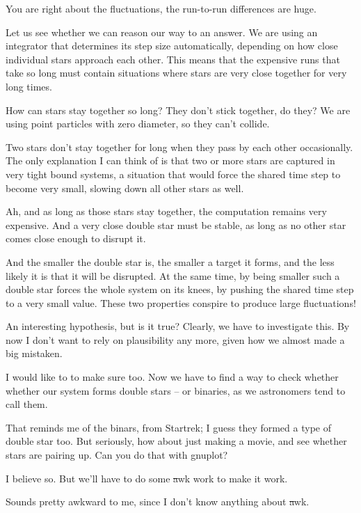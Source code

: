 \abc

\carol
You are right about the fluctuations, the run-to-run differences are huge.

\alice
Let us see whether we can reason our way to an answer.  We are using
an integrator that determines its step size automatically, depending on
how close individual stars approach each other.  This means that the
expensive runs that take so long must contain situations where stars
are very close together for very long times.

\bob
How can stars stay together so long?  They don't stick together, do
they?  We are using point particles with zero diameter, so they can't
collide.

\alice
Two stars don't stay together for long when they pass by each other
occasionally.  The only explanation I can think of is that two or more
stars are captured in very tight bound systems, a situation that would
force the shared time step to become very small, slowing down all
other stars as well.

\bob
Ah, and as long as those stars stay together, the computation remains
very expensive.  And a very close double star must be stable, as long
as no other star comes close enough to disrupt it.

\alice
And the smaller the double star is, the smaller a target it forms, and
the less likely it is that it will be disrupted.  At the same time, by
being smaller such a double star forces the whole system on its knees,
by pushing the shared time step to a very small value.  These two
properties conspire to produce large fluctuations!

\carol
An interesting hypothesis, but is it true?  Clearly, we have to
investigate this.  By now I don't want to rely on plausibility any
more, given how we almost made a big mistaken.  

\alice
I would like to to make sure too.  Now we have to find a way to check
whether whether our system forms double stars -- or binaries, as we
astronomers tend to call them.

\bob
That reminds me of the binars, from Startrek; I guess they formed a
type of double star too.  But seriously, how about just making a
movie, and see whether stars are pairing up.  Can you do that with
gnuplot?

\carol
I believe so.  But we'll have to do some {\st awk} work to make it work.

\bob
Sounds pretty awkward to me, since I don't know anything about {\st awk}.


